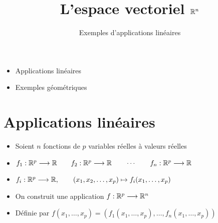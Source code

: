







\title{{\bf L'espace vectoriel $\mathbb{R}^n$}}
\subtitle{Exemples d'applications linéaires}

\begin{frame}
  
  \debutmontitre

  \pause

{\footnotesize
\hfill
{}
\begin{minipage}{0.6\textwidth}
  \begin{itemize}
    \item<3-> Applications linéaires
    \item<4-> Exemples géométriques 
  \end{itemize}
\end{minipage}
}

\end{frame}

\setcounter{framenumber}{0}


\section{Applications linéaires}

\begin{frame}

\begin{itemize}[<+->]\setlength{\itemsep}{8pt}
  \item Soient $n$ fonctions de $p$ variables réelles à valeurs réelles
  
  \item $f_1 : \mathbb{R}^p \longrightarrow \mathbb{R} \qquad f_2 : \mathbb{R}^p \longrightarrow \mathbb{R} \qquad \cdots \qquad f_n : \mathbb{R}^p \longrightarrow \mathbb{R}$
  
  \item $f_i : \mathbb{R}^p \longrightarrow \mathbb{R}, \qquad (x_1,x_2,\ldots,x_p) \mapsto f_i(x_1,\ldots,x_p)$
  
  \item On construit une application $f : \mathbb{R}^p \longrightarrow \mathbb{R}^n$
  
  \item Définie par $f(x_1,\dots , x_p)  = \left(f_1 (x_1, \dots , x_p), \dots , f_n (x_1, \dots , x_p)\right)$
  
\end{itemize}




\end{frame}


